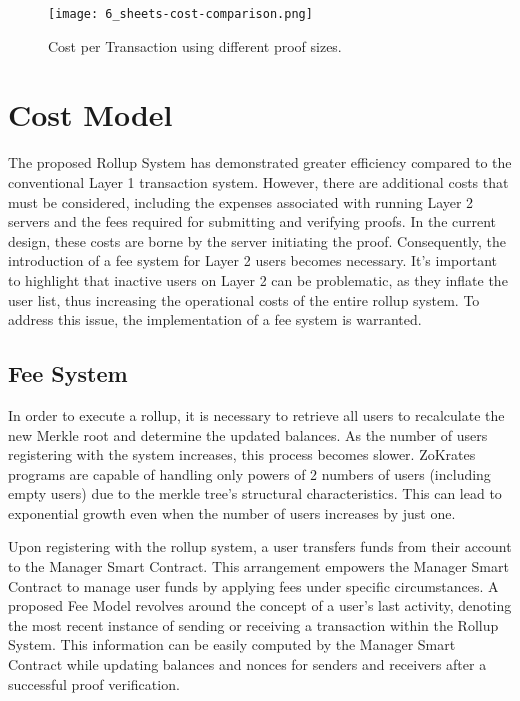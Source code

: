 \begin{figure}[ht]
	\centering
	\texttt{[image: 6\_sheets-cost-comparison.png]}
	\caption[Cost Comparison]{Cost per Transaction using different proof sizes.}  
	\label{fig:6_sheets-cost-comparison.png}
  \end{figure} 

  \section{Cost Model}

The proposed Rollup System has demonstrated greater efficiency compared to the conventional Layer 1 transaction system. However, there are additional costs that must be considered, including the expenses associated with running Layer 2 servers and the fees required for submitting and verifying proofs. In the current design, these costs are borne by the server initiating the proof. Consequently, the introduction of a fee system for Layer 2 users becomes necessary. It's important to highlight that inactive users on Layer 2 can be problematic, as they inflate the user list, thus increasing the operational costs of the entire rollup system. To address this issue, the implementation of a fee system is warranted.

\subsection{Fee System}

In order to execute a rollup, it is necessary to retrieve all users to recalculate the new Merkle root and determine the updated balances. As the number of users registering with the system increases, this process becomes slower. ZoKrates programs are capable of handling only powers of 2 numbers of users (including empty users) due to the merkle tree's structural characteristics. This can lead to exponential growth even when the number of users increases by just one.

Upon registering with the rollup system, a user transfers funds from their account to the Manager Smart Contract. This arrangement empowers the Manager Smart Contract to manage user funds by applying fees under specific circumstances. A proposed Fee Model revolves around the concept of a user's last activity, denoting the most recent instance of sending or receiving a transaction within the Rollup System. This information can be easily computed by the Manager Smart Contract while updating balances and nonces for senders and receivers after a successful proof verification.

